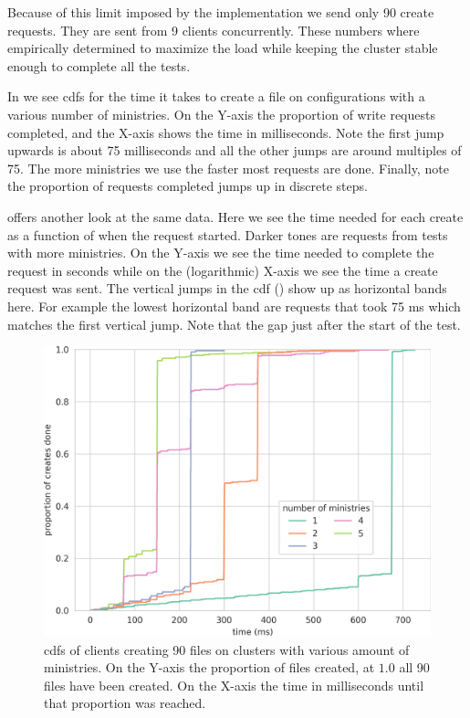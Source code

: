 Because of this limit imposed by the implementation we send only 90 create requests. They are sent from 9 clients concurrently. These numbers where empirically determined to maximize the load while keeping the cluster stable enough to complete all the tests.

In  we see \acp{cdf} for the time it takes to create a file on configurations with a various number of ministries. On the Y-axis the proportion of write requests completed, and the X-axis shows the time in milliseconds. Note the first jump upwards is about 75 milliseconds and all the other jumps are around multiples of 75. The more ministries we use the faster most requests are done. Finally, note the proportion of requests completed jumps up in discrete steps.

 offers another look at the same data. Here we see the time needed for each create as a function of when the request started. Darker tones are requests from tests with more ministries. On the Y-axis we see the time needed to complete the request in seconds while on the (logarithmic) X-axis we see the time a create request was sent. The vertical jumps in the \ac{cdf} () show up as horizontal bands here. For example the lowest horizontal band are requests that took 75 ms which matches the first vertical jump. Note that the gap just after the start of the test.

\begin{figure}[htb]
	\centering
	\includegraphics[height=\textheight]{../results/plots/touch.png}
	\caption{\acp{cdf} of clients creating 90 files on clusters with various amount of ministries. On the Y-axis the proportion of files created, at $1.0$ all 90 files have been created. On the X-axis the time in milliseconds until that proportion was reached.}
	\label{fig:touch}
\end{figure}

